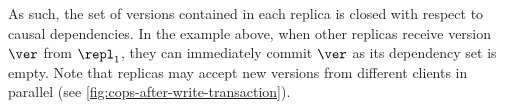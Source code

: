 As such, the set of versions contained in each replica is closed with respect to causal dependencies.
In the example above, when other replicas receive version $\ver$ from $\repl_1$, they can immediately commit $\ver$ as its dependency set is empty. 
Note that replicas may accept new versions from different clients in parallel (see \cref{fig:cops-after-write-transaction}).
%
%
%

